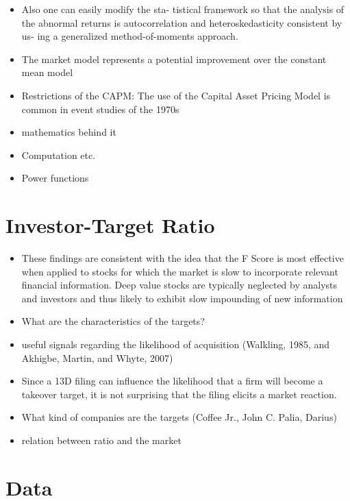 \documentclass[12pt]{article}
\begin{document}
\begin{itemize}
        \item Also one can easily modify the sta- tistical framework so that the analysis of the abnormal returns is autocorrelation and heteroskedasticity consistent by us- ing a generalized method-of-moments approach.\citet{MacKinlay1997}
        \item The market model represents a potential improvement over the constant mean model \citet{MacKinlay1997}
        \item Restrictions of the CAPM: The use of the Capital Asset Pricing Model is common in event studies of the 1970s \citet{MacKinlay1997} 
        \item mathematics behind it 
        \item Computation etc.
        \item Power functions 
    \end{itemize}

\section{Investor-Target Ratio} 

    \begin{itemize}
        \item These findings are consistent with the idea that the F Score is most effective when applied to stocks for which the market is slow to incorporate relevant financial information. Deep value stocks are typically neglected by analysts and investors and thus likely to exhibit slow impounding of new information \citet{Hyde2014}
        \item What are the characteristics of the targets?
        \item useful signals regarding the likelihood of acquisition
        (Walkling, 1985, and Akhigbe, Martin, and Whyte, 2007) \citet{Brigida2012}
        \item Since a 13D filing can influence the likelihood that a firm will become a takeover target, it is not surprising that the filing elicits a market reaction.\citet{Brigida2012}
        \item What kind of companies are the targets (Coffee Jr., John C.
        Palia, Darius)
        \item relation between ratio and the market 
    \end{itemize}

\section{Data}
\end{document}
